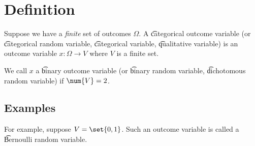 
\section*{Definition}

Suppose we have a \textit{finite} set of outcomes $\Omega $.
A \t{categorical outcome variable} (or \t{categorical random variable}, \t{categorical variable}, \t{qualitative variable}) is an outcome variable $x: \Omega  \to V$ where $V$ is a finite set.

We call $x$ a \t{binary outcome variable} (or \t{binary random variable}, \t{dichotomous random variable}) if $\num{V} = 2$.

\subsection*{Examples}

For example, suppose $V = \set{0,1}$.
Such an outcome variable is called a \t{Bernoulli random variable}.

\blankpage